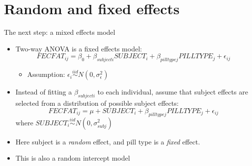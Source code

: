 \documentclass[
  ignorenonframetext,
]{beamer}
\providecommand{\tightlist}{%
  \setlength{\itemsep}{0pt}\setlength{\parskip}{0pt}}
\begin{document}
\hypertarget{random-and-fixed-effects}{%
\section{Random and fixed effects}\label{random-and-fixed-effects}}

\begin{frame}{The next step: a mixed effects model}
\protect\hypertarget{the-next-step-a-mixed-effects-model}{}

\begin{itemize}
\item
  Two-way ANOVA is a fixed effects model: \[
  FECFAT_{ij} = \beta_0 + \beta_{subject i} SUBJECT_i + \beta_{pilltype j} PILLTYPE_j + \epsilon_{ij}
  \]

  \begin{itemize}
  \tightlist
  \item
    Assumption:
    \(\epsilon_i \stackrel{iid}{\sim} N(0, \sigma_\epsilon^2)\)
  \end{itemize}
\item
  Instead of fitting a \(\beta_{subject i}\) to each individual, assume
  that subject effects are selected from a distribution of possible
  subject effects: \[
  FECFAT_{ij} = \mu + SUBJECT_i + \beta_{pilltype j} PILLTYPE_j + \epsilon_{ij}
  \] where \(SUBJECT_i \stackrel{iid}{\sim} N(0, \sigma_{subj}^2)\)
\item
  Here subject is a \emph{random} effect, and pill type is a
  \emph{fixed} effect.
\item
  This is also a random intercept model
\end{itemize}

\end{frame}
\end{document}
